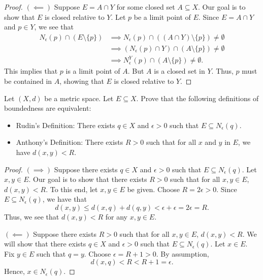 \documentclass[a4paper]{article}
\begin{document}
\begin{proof}
    \( (\impliedby) \) Suppose \( E = A \cap Y  \) for some closed set \( A \subseteq X  \). Our goal is to show that \( E  \) is closed relative to \( Y  \). Let \( p  \) be a limit point of \( E  \). Since \( E = A \cap Y  \) and \( p \in Y  \), we see that 
    \begin{align*}
        {N}_{\epsilon}(p) \cap (E \setminus  \{ p \} ) &\implies {N}_{\epsilon}(p) \cap ((A \cap Y) \setminus  \{ p \} ) \neq \emptyset \\
                                                       &\implies ({N}_{\epsilon}(p) \cap Y) \cap (A \setminus  \{ p \} ) \neq \emptyset \\
                                                       &\implies {N}_{\epsilon}^{Y}(p) \cap (A \setminus  \{ p \} ) \neq \emptyset.
    \end{align*}
    This implies that \( p  \) is a limit point of \( A  \). But \( A  \) is a closed set in \( Y  \). Thus, \( p  \) must be contained in \( A  \), showing that \( E  \) is closed relative to \( Y  \).
\end{proof}
   
   \begin{problem}
   Let \( (X,d) \) be a metric space. Let \( E \subseteq  X \). Prove that the following definitions of boundedness are equivalent:
    \begin{itemize}
        \item Rudin's Definition: There exists \( q \in X  \) and \( \epsilon > 0  \) such that \( E \subseteq {N}_{\epsilon}(q) \).
        \item Anthony's Definition: There exists \( R > 0  \) such that for all \( x  \) and \( y  \) in \( E  \), we have \( d(x,y) < R  \).
    \end{itemize}
   \end{problem}
   \begin{proof}
    \( (\implies) \) Suppose there exists \( q \in X  \) and \(  \epsilon > 0 \) such that \( E \subseteq  {N}_{\epsilon}(q) \). Let \( x,y \in E  \). Our goal is to show that there exists \( R > 0  \) such that for all \( x,y \in E  \), \( d(x,y) < R  \). To this end, let \( x,y \in E  \) be given. Choose \( R = 2 \epsilon > 0   \). Since \( E \subseteq  {N}_{\epsilon}(q) \), we have that         
    \[  d(x,y) \leq d(x,q) + d(q,y) < \epsilon + \epsilon = 2 \epsilon = R.  \]
    Thus, we see that \( d(x,y) < R  \) for any \( x,y \in E  \).

    \( (\impliedby) \) Suppose there exists \( R > 0  \) such that for all \( x,y \in E  \), \( d(x,y) < R  \). We will show that there exists \( q \in X  \) and \( \epsilon > 0  \) such that \( E \subseteq {N}_{\epsilon}(q) \). Let \( x \in E  \). Fix \( y \in E  \) such that \( q = y  \). Choose \( \epsilon = R + 1 > 0  \). By assumption,  
    \[  d(x,q) < R < R + 1 = \epsilon.  \]
    Hence, \( x \in {N}_{\epsilon}(q) \).
   \end{proof}
\end{document}
